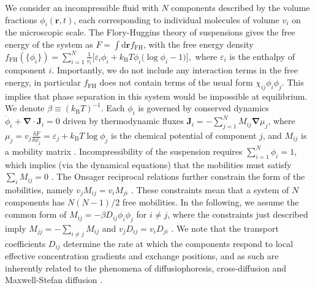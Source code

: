 We consider an incompressible fluid with $N$ components described by the volume fractions $\phi_i(\bm{r},t)$, each corresponding to individual molecules of volume $v_i$ on the microscopic scale. The Flory-Huggins theory of suspensions gives the free energy of the system as $F = \int \mathrm{d}\bm{r} f_\mathrm{FH}$, with the free energy density
\begin{math}%
    f_\mathrm{FH}(\{\phi_i\}) = \sum_{i=1}^{N} \frac{1}{v_i} \big[\varepsilon_i\phi_i + k_\mathrm{B}T \phi_i \big(\log\phi_i-1\big) \big], 
    \label{eq:fh_gen}
\end{math} %
where $\varepsilon_i$ is the enthalpy of component $i$. Importantly, we do not include any interaction terms in the free energy, in particular $f_\mathrm{FH}$ does not contain terms of the usual form $\chi_{ij}\phi_i \phi_j$. This implies that phase separation in this system would be impossible at equilibrium. We denote $\beta \equiv (k_\mathrm{B}T)^{-1}$. Each $\phi_i$ is governed by conserved dynamics $\dot{\phi}_i +\bm{\nabla}\cdot\bm{J}_i=0$ driven by thermodynamic fluxes $\bm{J}_i = - \sum_{j=1}^N M_{ij}\bm{\nabla}\mu_j$, where $\mu_j=v_j\frac{\delta F}{\delta \phi_j}=\varepsilon_j+k_\mathrm{B}T \log\phi_j$ is the chemical potential of component $j$, and $M_{ij}$ is a mobility matrix \cite{groot_non-equilibrium_1984}. Incompressibility of the suspension requires $\sum_{i=1}^N\phi_i=1$, which implies (via the dynamical equations)
that the mobilities must satisfy $\sum_i M_{ij} = 0$ \cite{kehr1989mobility}. The Onsager reciprocal relations further constrain the form of the mobilities, namely $v_j M_{ij} = v_i M_{ji}$ \cite{grootNonequilibriumThermodynamics1984}. These constraints mean that a system of $N$ components has $N(N-1)/2$ free mobilities. In the following, we assume the common form of $M_{ij} = -\beta D_{ij}\phi_i\phi_j$ for $i \neq j$, where the constraints just described imply $M_{jj}= - \sum_{i\neq j} M_{ij}$ and $v_j D_{ij} = v_i D_{ji}$ \cite{KRAMER1984473,kehr1989mobility,mao2020designing,bo2021}. We note that the transport coefficients $D_{ij}$ determine the rate at which the components respond to local effective concentration gradients and exchange positions, and as such are inherently related to the phenomena of diffusiophoresis, cross-diffusion and Maxwell-Stefan diffusion \cite{suppmat}.

